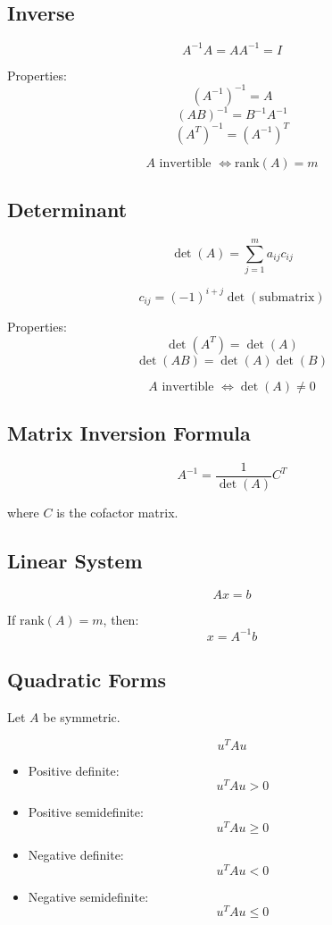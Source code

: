 \subsection{Inverse}

\[
A^{-1}A = AA^{-1} = I
\]

Properties:
\[
(A^{-1})^{-1} = A
\]
\[
(AB)^{-1} = B^{-1}A^{-1}
\]
\[
(A^T)^{-1} = (A^{-1})^T
\]

\[
A \text{ invertible } \iff \text{rank}(A) = m
\]

\subsection{Determinant}

\[
\det(A) = \sum_{j=1}^m a_{ij} c_{ij}
\]

\[
c_{ij} = (-1)^{i+j} \det(\text{submatrix})
\]

Properties:
\[
\det(A^T) = \det(A)
\]
\[
\det(AB) = \det(A)\det(B)
\]

\[
A \text{ invertible } \iff \det(A) \neq 0
\]

\subsection{Matrix Inversion Formula}

\[
A^{-1} = \frac{1}{\det(A)} C^T
\]

where $C$ is the cofactor matrix.

\subsection{Linear System}

\[
Ax = b
\]

If $\text{rank}(A)=m$, then:
\[
x = A^{-1}b
\]

\subsection{Quadratic Forms}

Let $A$ be symmetric.

\[
u^T A u
\]

\begin{itemize}
    \item Positive definite:
    \[
    u^T A u > 0
    \]
    \item Positive semidefinite:
    \[
    u^T A u \ge 0
    \]
    \item Negative definite:
    \[
    u^T A u < 0
    \]
    \item Negative semidefinite:
    \[
    u^T A u \le 0
    \]
\end{itemize}